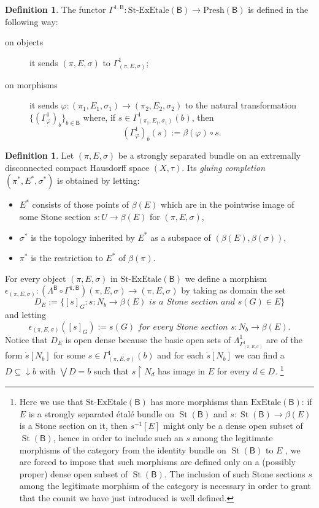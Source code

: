 \documentclass[11pt]{amsart}
\newcommand{\Presh}{\textrm{Presh}}
\newcommand{\stexetale}{\textrm{St-ExEtale}}
\newcommand{\exetale}{\textrm{ExEtale}}
\theoremstyle{plain}
\theoremstyle{definition}
\newtheorem{definition}[theorem]{Definition}
\theoremstyle{plain}
\theoremstyle{remark}
\DeclareMathOperator{\St}{St}
\newcommand{\bool}[1]{\mathsf{#1}}
\newcommand{\0}{\mathsf{0}}
\renewcommand{\1}{\mathsf{1}}
\renewcommand{\2}{\mathsf{2}}
\theoremstyle{definition}
\begin{document}
\begin{definition}
The functor $\Gamma^{1, \bool{B}}:\stexetale(\bool{B})\to\Presh(\bool{B})$ is defined in the following way:
\begin{description}
\item[on objects] it sends $(\pi, E, \sigma)$ to $\Gamma^{1}_{(\pi, E, \sigma)}$;
\item[on morphisms] it sends $\varphi:(\pi_1, E_1, \sigma_1)\to(\pi_2, E_2, \sigma_2)$ to the natural transformation $\{(\Gamma^1_\varphi)_b\}_{b\in\bool{B}}$ where, if $s\in\Gamma^1_{(\pi_1, E_1, \sigma_1)}(b)$, then
\[
(\Gamma^1_\varphi)_b(s):=\beta(\varphi)\circ s.
\]
\end{description}
\end{definition}
\begin{definition}\label{def:gluingcompletion}
Let $(\pi,E,\sigma)$ be a strongly separated bundle on an extremally disconnected compact Hausdorff space $(X,\tau)$. Its \emph{gluing completion} $(\pi^*,E^*,\sigma^*)$ is obtained by letting:
\begin{itemize}
\item 
$E^*$ consists of those points of $\beta(E)$ which are in the pointwise image of some Stone section $s:U\to \beta(E)$ for $(\pi,E,\sigma)$,
\item $\sigma^*$ is the topology inherited by $E^*$ as a subspace of $(\beta(E),\beta(\sigma))$,
\item $\pi^*$ is the restriction to $E^*$ of $\beta(\pi)$.
\end{itemize}
\end{definition}
For every object $(\pi, E, \sigma)$ in $\stexetale(\bool{B})$ we define a morphism $\epsilon_{(\pi, E, \sigma)}:(\Lambda^{\bool{B}}\circ\Gamma^{1,\bool{B}})(\pi, E, \sigma)\to(\pi, E, \sigma)$ by taking as domain the set
\[
D_E:=\{[s]_G: s:N_b\to\beta(E)\textit{ is a Stone section and }s(G)\in E\}
\]
and letting
\[
\epsilon_{(\pi, E, \sigma)}([s]_G):=s(G)\textit{ for every Stone section }s:N_b\to\beta(E).
\]
Notice that $D_E$ is open dense because the basic open sets of $\Lambda^1_{\Gamma^1_{(\pi, E, \sigma)}}$ are of the form $\dot{s}[N_b]$ for some $s\in\Gamma^1_{(\pi, E, \sigma)}(b)$ and for each $\dot{s}[N_b]$ we can find a $D\subseteq\downarrow b$ with $\bigvee D=b$ such that $s\restriction N_d$ has image in $E$ for every $d\in D$.
\footnote{Here we use that $\stexetale(\bool{B})$ has more morphisms than $\exetale(\bool{B})$: if $E$ is a strongly separated \'etal\'e bundle on $\St(\bool{B})$ and $s:\St(\bool{B}) \to\beta(E)$ is a Stone section on it, then $s^{-1}[E]$ might only be a dense open subset of $\St(\bool{B})$, hence in order to include such an $s$ among the legitimate morphisms of the category from the identity bundle on $\St(\bool{B})$ to $E$ , we are forced to impose that such morphisms  are defined only on a (possibly proper) dense open subset of $\St(\bool{B})$. The inclusion of such Stone sections $s$ among the legitimate morphism of the category is necessary in order to grant that the counit we have just introduced is well defined.}
\end{document}
